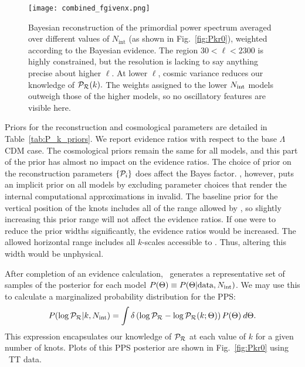 \begin{figure}
\begin{center}
  \texttt{[image: combined\_fgivenx.png]}
\end{center}
\caption{
Bayesian reconstruction of the primordial power spectrum averaged over different values of $N_\mathrm{int}$
(as shown in Fig.~\protect\ref{fig:Pkr0}), weighted according to the Bayesian evidence.
The region ${30<\ell<2300}$ is highly constrained, but the resolution is lacking to say anything precise 
about higher $\ell$. At lower $\ell$, cosmic variance reduces our knowledge of $\mathcal{P}_\mathcal{R}(k).$
The weights assigned to the lower $N_\mathrm{int}$ models outweigh those of the higher models, so no oscillatory 
features are visible here.
\label{fig:full_bayes_knots}}
\end{figure}



Priors for the reconstruction and cosmological parameters are detailed in Table~\ref{tab:P_k_priors}.
We report evidence ratios with respect to the base $\Lambda$CDM case. The cosmological priors remain the
same for all models, and this part of the prior has almost no impact on the evidence ratios.
The choice of prior on the reconstruction parameters
$\{\mathcal{P}_{i}\}$ does affect the Bayes factor. \CosmoMC{}, however, puts an implicit prior on all models by excluding
parameter choices that render the internal computational approximations in \CAMB{} invalid.
The baseline prior for the vertical position of the knots includes all
of the range allowed by \CosmoMC{}, so slightly increasing this prior range will not affect the evidence ratios. If
one were to reduce the prior widths significantly, the evidence ratios would be increased.
The allowed horizontal range includes all $k$-scales accessible to \Planck. Thus, altering this
width would be unphysical.


After completion of an evidence calculation, \PolyChord\ generates a representative set of samples of the posterior for each model
$P(\Theta) \equiv P(\Theta|\mathrm{data},N_\mathrm{int})$. We may use this to calculate a marginalized probability distribution
for the PPS:
\begin{equation}
  P(\log\mathcal{P}_\mathcal{R}|k,N_\mathrm{int}) = \int \delta\left(\log\mathcal{P}_\mathcal{R} - \log\mathcal{P}_\mathcal{R}(k;\Theta)\right)P(\Theta)\:d\Theta.
  \label{eqn:margPR}
\end{equation}
This expression encapsulates our knowledge of $\mathcal{P}_\mathcal{R}$ at each value of $k$ for a given number of knots.
Plots of this PPS posterior are shown in Fig.~\ref{fig:Pkr0} using \Planck\ TT data.



